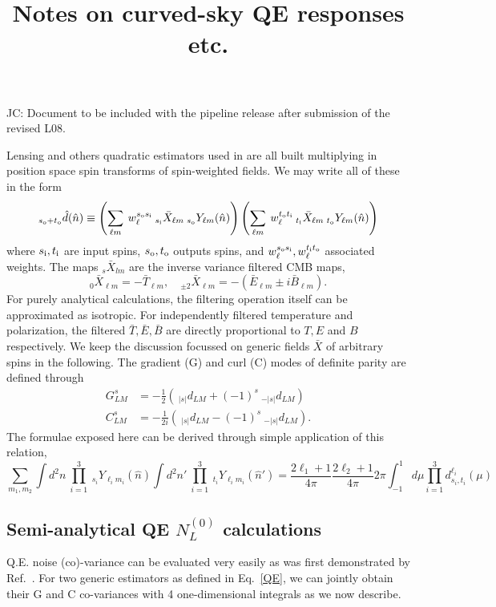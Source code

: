 \documentclass{article}
\newcommand{\si}[0]{{s_{\rm i}}}
\newcommand{\ti}[0]{{t_{\rm i}}}
\newcommand{\so}[0]{{s_{\rm o}}}
\renewcommand{\to}[0]{{t_{\rm o}}}
\newcommand{\JC}[1]{\color{red}JC: #1\color{black}}
\newcommand{\hn}[0]{\hat n}
\begin{document}
\title{Notes on curved-sky QE responses etc.}
\maketitle
\tableofcontents
\vspace{1cm}
\JC{Document to be included with the pipeline release after submission of the revised L08.}

Lensing and others quadratic estimators used in \cite{??} are all built multiplying in position space spin transforms of spin-weighted fields. We may write all of these in the form \begin{equation}\label{QE}
 _{\so + \to}\hat d(\hn) \equiv  \left(\sum_{\ell m}\: w^{\so\si}_\ell \:_{\si} \bar X_{\ell m} \:_\so Y_{\ell m}(\hn)\right)\left(\sum_{\ell m}\:w^{\to\ti}_\ell  \:_{\ti} \bar X_{\ell m} \:_\to Y_{\ell m}(\hn)\right)
\end{equation}
where $\si, \ti$ are input spins, $\so, \to$ outputs spins, and $w_\ell^{\so\si}, w_\ell^{\ti\to}$ associated weights. The maps $_s \bar X_{lm}$ are the inverse variance filtered CMB maps,
\begin{equation}
	_0 \bar X_{\ell m} = -\bar T_{\ell m} , \quad _{\pm 2} \bar X_{\ell m} = -\left(\bar E_{\ell m} \pm i\bar B_{\ell m} \right).
\end{equation}
For purely analytical calculations, the filtering operation itself can be approximated as isotropic. For independently filtered temperature and polarization, the filtered $\bar T, \bar E, \bar B$ are directly proportional to $T, E$ and $B$ respectively. 
We keep the discussion focussed on generic fields $\bar X$ of arbitrary spins in the following. The gradient (G) and curl (C) modes of definite parity are defined through
\begin{eqnarray*}
		G^{s}_{LM} &= -\frac 12\left(\:_{|s|} d_{LM} + (-1)^s \:_{-|s|} d_{LM}\right)  \\
		C^{s}_{LM} &=-\frac 1{2i} \left( \:_{|s|} d_{LM} - (-1)^s \:_{-|s|} d_{LM} \right) .
\end{eqnarray*}
The formulae exposed here can be derived through simple application of this relation,
\begin{equation}
\sum_{m_1,m_2}\int d^2n\: \prod_{i = 1}^3\:_{s_i} Y_{\ell_i m_i}(\hn)\int d^2n'\: \prod_{i = 1}^3\:_{t_i} Y_{\ell_i m_i}(\hn') = \frac{2\ell_1 + 1}{4\pi}\frac{2\ell_2 + 1} {4\pi} 2\pi \int_{-1}^{1} d\mu \prod_{i = 1}^3 d^{\ell_i}_{s_i, t_i}(\mu)
\end{equation}
\subsection{Semi-analytical QE $N^{(0)}_L$ calculations}
Q.E. noise (co)-variance can be evaluated very easily as was first demonstrated by Ref.~\cite{}. For two generic estimators as defined in Eq.~\eqref{QE}, we can jointly obtain their G and C co-variances with 4 one-dimensional integrals as we now describe.
\end{document}
